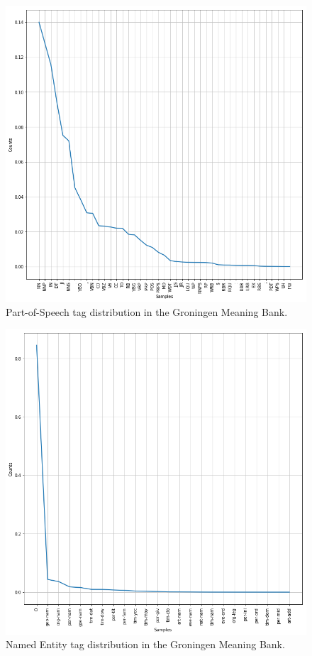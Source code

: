 \documentclass[twocolumns]{IEEEtran}
\begin{document}
\pagebreak
\begin{figure}
\centering
\includegraphics[scale=0.7]{pos_tags_dist.png}
\caption{Part-of-Speech tag distribution in the Groningen Meaning Bank.}
\end{figure}

\pagebreak
\begin{figure}
\centering
\includegraphics[scale=0.7]{entity_tag_dist.png}
\caption{Named Entity tag distribution in the Groningen Meaning Bank.}
\end{figure}
\end{document}
